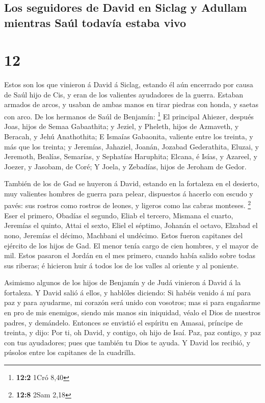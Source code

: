 \hypertarget{los-seguidores-de-david-en-siclag-y-adullam-mientras-sauxfal-todavuxeda-estaba-vivo}{%
\subsection{Los seguidores de David en Siclag y Adullam mientras Saúl
todavía estaba
vivo}\label{los-seguidores-de-david-en-siclag-y-adullam-mientras-sauxfal-todavuxeda-estaba-vivo}}

\hypertarget{section-11}{%
\section{12}\label{section-11}}

 Estos son los que vinieron á David á Siclag, estando él
aún encerrado por causa de Saúl hijo de Cis, y eran de los valientes
ayudadores de la guerra.  Estaban armados de arcos, y
usaban de ambas manos en tirar piedras con honda, y saetas con arco. De
los hermanos de Saúl de Benjamín: \footnote{\textbf{12:2} 1Cró 8,40}
 El principal Ahiezer, después Joas, hijos de Semaa
Gabaathita; y Jeziel, y Pheleth, hijos de Azmaveth, y Beracah, y Jehú
Anathothita;  E Ismaías Gabaonita, valiente entre los
treinta, y más que los treinta; y Jeremías, Jahaziel, Joanán, Jozabad
Gederathita,  Eluzai, y Jeremoth, Bealías, Semarías, y
Sephatías Haruphita;  Elcana, é Isías, y Azareel, y
Joezer, y Jasobam, de Coré;  Y Joela, y Zebadías, hijos de
Jeroham de Gedor.

 También de los de Gad se huyeron á David, estando en la
fortaleza en el desierto, muy valientes hombres de guerra para pelear,
dispuestos á hacerlo con escudo y pavés: sus rostros como rostros de
leones, y ligeros como las cabras monteses. \footnote{\textbf{12:8} 2Sam
  2,18}  Eser el primero, Obadías el segundo, Eliab el
tercero,  Mismana el cuarto, Jeremías el quinto,
 Attai el sexto, Eliel el séptimo, 
Johanán el octavo, Elzabad el nono,  Jeremías el décimo,
Machbani el undécimo.  Estos fueron capitanes del
ejército de los hijos de Gad. El menor tenía cargo de cien hombres, y el
mayor de mil.  Estos pasaron el Jordán en el mes primero,
cuando había salido sobre todas sus riberas; é hicieron huir á todos los
de los valles al oriente y al poniente.

 Asimismo algunos de los hijos de Benjamín y de Judá
vinieron á David á la fortaleza.  Y David salió á ellos,
y hablóles diciendo: Si habéis venido á mí para paz y para ayudarme, mi
corazón será unido con vosotros; mas si para engañarme en pro de mis
enemigos, siendo mis manos sin iniquidad, véalo el Dios de nuestros
padres, y demándelo.  Entonces se envistió el espíritu en
Amasai, príncipe de treinta, y dijo: Por ti, oh David, y contigo, oh
hijo de Isaí. Paz, paz contigo, y paz con tus ayudadores; pues que
también tu Dios te ayuda. Y David los recibió, y púsolos entre los
capitanes de la cuadrilla.

